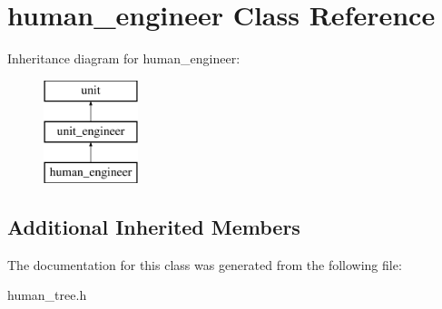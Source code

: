 \hypertarget{classhuman__engineer}{}\section{human\+\_\+engineer Class Reference}
\label{classhuman__engineer}
Inheritance diagram for human\+\_\+engineer\+:\begin{figure}[H]
\begin{center}
\leavevmode
\includegraphics[height=3.000000cm]{classhuman__engineer}
\end{center}
\end{figure}
\subsection*{Additional Inherited Members}


The documentation for this class was generated from the following file\+:\begin{DoxyCompactItemize}
\item 
human\+\_\+tree.\+h\end{DoxyCompactItemize}
